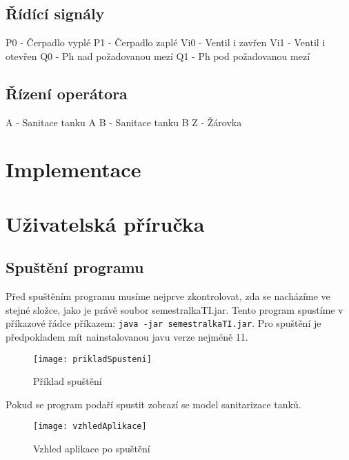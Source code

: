 \documentclass[12pt, a4paper]{article}
\begin{document}
\subsection{Řídící signály}
P0 - Čerpadlo vyplé \newline 
P1 - Čerpadlo zaplé \newline 
Vi0 - Ventil i zavřen \newline 
Vi1 - Ventil i otevřen \newline 
Q0 - Ph nad požadovanou mezí \newline 
Q1 - Ph pod požadovanou mezí 

\subsection{Řízení operátora}
A - Sanitace tanku A \newline 
B - Sanitace tanku B \newline 
Z - Žárovka

\section{Implementace}

\section{Uživatelská příručka}

\subsection{Spuštění programu}
Před spuštěním programu musíme nejprve zkontrolovat, zda se nacházíme ve stejné složce, jako je právě soubor semestralkaTI.jar. Tento program spustíme v příkazové řádce příkazem: \texttt{java -jar semestralkaTI.jar}. Pro spuštění je předpokladem mít nainstalovanou javu verze nejméně 11.

\begin{figure}[h]
\centering 
\texttt{[image: prikladSpusteni]}
\caption{Příklad spuštění}
\end{figure}

Pokud se program podaří spustit zobrazí se model sanitarizace tanků.

\begin{figure}
\centering 
\texttt{[image: vzhledAplikace]}
\caption{Vzhled aplikace po spuštění}
\end{figure}
\end{document}
